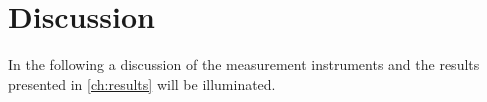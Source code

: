 \chapter{Discussion}\label{ch:discussion}
In the following a discussion of the measurement instruments and the results presented in \cref{ch:results} will be illuminated. %



